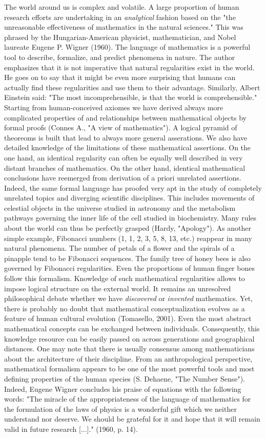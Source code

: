 \documentclass[authoryear,review,3p]{elsarticle}
\begin{document}
The world around us is complex and volatile.
%
A large proportion of human research efforts are undertaking
in an \textit{analytical} fashion
based on the 
"the unreasonable effectiveness of mathematics in the natural sciences."
This was phrased by the Hungarian-American
physicist, mathematician, and Nobel laureate Eugene P. Wigner (1960).
The language of mathematics is a powerful tool to
describe, formalize, and predict phenomena in nature.
The author emphasizes that it is not imperative that
natural regularities exist in the world. He goes on to
say that it might be even more surprising that humans can actually
find these regularities and use them to their advantage.
Similarly, Albert Einstein said:
"The most incomprehensible, is that the world is comprehensible." 
%
Starting from human-conceived axiomes
we have derived always more complicated
properties of and relationships between mathematical objects by formal proofs
(Connes A., "A view of mathematics").
A logical pyramid of theoreoms is built that lead to always
more general asserations.
We also have detailed knowledge of the limitations of these mathematical
assertions.
%
On the one hand,
an identical regularity can often be equally well described in very distant
branches of mathematics.
On the other hand,
identical mathematical conclusions have reemerged from derivation of
a priori unrelated assertions.
%
Indeed, the same formal language has proofed very apt in
the study of completely unrelated topics and diverging scientific disciplines.
This includes movements of celestial objects in the universe
studied in astronomy
and
the metabolism pathways governing the inner life of the cell
studied in biochemistry.
%
Many rules about the world can thus be perfectly grasped
(Hardy, "Apology").
As another simple example,
Fibonacci numbers (1, 1, 2, 3, 5, 8, 13, etc.)
reappear in many natural phenomena.
The number of petals of a flower and the spirals of a pinapple tend
to be Fibonacci sequences.
The family tree of honey bees is also governed by Fibonacci regularities.
Even the proportions of human finger bones follow this formalism.
Knowledge of such mathematical regularities
allows to impose logical structure on the external world.
%
It remains an unresolved philosophical debate whether we have
\textit{discovered} or \textit{invented} mathematics.
Yet, there is probably no doubt
that mathematical conceptualization
evolves as a feature of human cultural evolution (Tomasello, 2001).
Even the most abstract mathematical concepts can
be exchanged between individuals. Consequently,
this knowledge resource can be easily passed
on across generations and geographical distances.
One may note that
there is usually consensus among mathematicians
about the architecture of their discipline.
From an anthropological perspective,
mathematical formalism
appears to be one of the most
powerful tools and most defining properties of the human species
(S. Dehaene, "The Number Sense").
Indeed,
Eugene Wigner concludes his praise of equations with the following words:
"The miracle of the appropriateness of the language of mathematics
for the formulation of the laws of physics is a wonderful gift
which we neither understand nor deserve. We should be grateful for
it and hope that it will remain valid in future research [...]."
(1960, p. 14).
\end{document}
